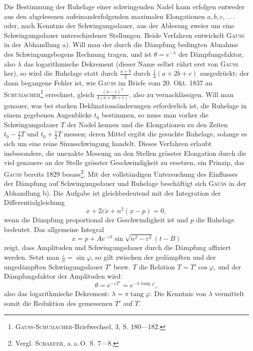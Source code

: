 Die Bestimmung der Ruhelage einer schwingenden Nadel kann erfolgen
entweder aus den abgelesenen aufeinanderfolgenden maximalen Elongationen
\(a,b,c,\, .\, .\, .\) oder, nach Kenntnis der Schwingungsdauer, aus der Ablesung zweier
um eine Schwingungsdauer unterschiedener Stellungen. Beide Verfahren entwickelt
\textsc{Gauss} in der Abhandlung a). Will man der durch die Dämpfung
bedingten Abnahme des Schwingungsbogens Rechnung tragen, und ist \(\theta=e^{-\lambda}\)
der Dämpfungsfaktor, also \(\lambda\) das logarithmische Dekrement (dieser Name selbst
rührt erst von \textsc{Gauss} her), so wird die Ruhelage statt durch \(\frac{a+b}{2}\) durch
\(\frac14(a+2b+c)\) ausgedrückt; der dann begangene Fehler ist, wie \textsc{Gauss} im Briefe
vom 20. Okt. 1837 an \textsc{Schumacher}\footnote{\textsc{Gauss-Schumacher}-Briefwechsel, 3, S. 180—182.} errechnet, gleich \(\frac{(a-c)^2}{4(a+2b+c)}\), also zu
vernachlässigen. Will man genauer, was bei starken Deklinationsänderungen
erforderlich ist, die Ruhelage in einem gegebenen Augenblicke \(t_0\) bestimmen,
so muss man vorher die Schwingungsdauer \(T\) der Nadel kennen und die Elongationen
zu den Zeiten \(t_0-\frac12T\) und \(t_0+\frac12T\) messen; deren Mittel ergibt die
gesuchte Ruhelage, solange es sich um eine reine Sinusschwingung handelt.
Dieses Verfahren erlaubt insbesondere, die unexakte Messung an den Stellen
grösster Elongation durch die viel genauere an der Stelle grösster Geschwindigkeit
zu ersetzen, ein Prinzip, das \textsc{Gauss} bereits 1829 besass\footnote{Vergl. \textsc{Schaefer}, a.\,a.\,O. S. 7—8.}. Mit der vollständigen
Untersuchung des Einflusses der Dämpfung auf Schwingungsdauer
und Ruhelage beschäftigt sich \textsc{Gauss} in der Abhandlung b). Die Aufgabe ist
gleichbedeutend mit der Integration der Differentialgleichung
\[
\ddot{x}+2\varepsilon\dot{x}+n^2(x-p)=0,\tag{1}
\]
\noindent wenn die Dämpfung proportional der Geschwindigkeit ist und \(p\) die Ruhelage
bedeutet. Das allgemeine Integral
\[
x=p+Ae^{-\varepsilon t}\sin\sqrt{n^2-\varepsilon^2}(t-B)
\]
\noindent zeigt, dass Amplituden und Schwingungsdauer durch die Dämpfung affiziert
werden. Setzt man \(\frac\varepsilon n=\sin\varphi\), so gilt zwischen der gedämpften und der ungedämpften
Schwingungsdauer \(T'\) bezw. \(T\) die Relation \(T=T'\cos\varphi\), und der
Dämpfungsfaktor der Amplituden wird:
\[
\theta=e^{-\varepsilon T'}=e^{-\pi\operatorname{tang}\varphi},
\]
\clearpage{}
\noindent also das logarithmische Dekrement: \(\lambda=\pi\operatorname{tang}\varphi\). Die Kenntnis von \(\lambda\) vermittelt
somit die Reduktion des gemessenen \(T'\) auf \(T\).

